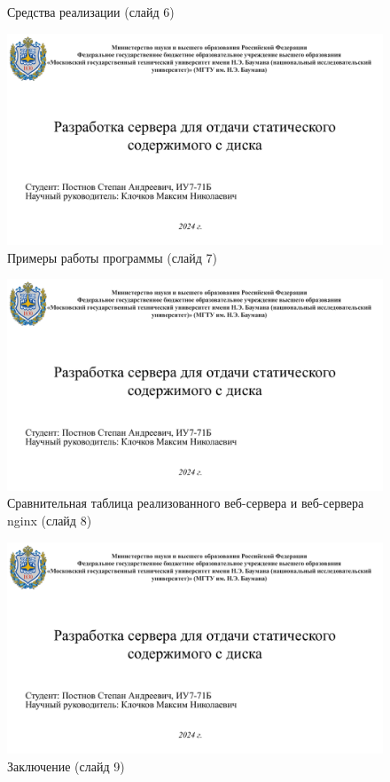 \begin{appendices}
\begin{figure}[h]
		\caption{Средства реализации (слайд 6)}
	\end{figure}
	\begin{figure}[h]
		\centering
		\includegraphics[height=0.5\textheight, page=7, angle=90]{inc/img/pres.pdf}
		\caption{Примеры работы программы (слайд 7)}
	\end{figure}
	\begin{figure}[h]
		\centering
		\includegraphics[height=0.5\textheight, page=8, angle=90]{inc/img/pres.pdf}
		\caption{Сравнительная таблица реализованного веб-сервера и веб-сервера nginx (слайд 8)}
	\end{figure}
	\begin{figure}[h]
		\centering
		\includegraphics[height=0.5\textheight, page=9, angle=90]{inc/img/pres.pdf}
		\caption{Заключение (слайд 9)}
	\end{figure}
\end{appendices}